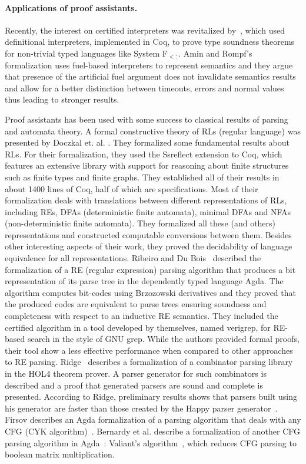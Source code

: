 \paragraph{Applications of proof assistants.}


Recently, the interest on certified interpreters was revitalized by~\citet{Amin17}, which used definitional
interpreters, implemented in Coq, to prove type soundness theorems for non-trivial typed languages like System F$_{<:}$.
Amin and Rompf's formalization uses fuel-based interpreters to represent semantics and they argue that presence of
the artificial fuel argument does not invalidate semantics results and allow for a better distinction between timeouts,
errors and normal values thus leading to stronger results.


Proof assistants has been used with some success to classical results of parsing and automata theory.
A formal constructive theory of RLs (regular language) was presented by Doczkal et. al.
\cite{Doczkal13}. They formalized some fundamental results about RLs.
For their formalization, they used the Ssreflect extension to Coq, which
features an extensive library with support for reasoning about finite
structures such as finite types and finite graphs. They established all
of their results in about 1400 lines of Coq, half of which are specifications.
Most of their formalization deals with translations between different
representations of RLs, including REs, DFAs (deterministic finite automata),
minimal DFAs and NFAs (non-deterministic finite automata).
They formalized all these (and others) representations and constructed
computable conversions between them. Besides other interesting aspects
of their work, they proved the decidability of language equivalence
for all representations. Ribeiro and Du Bois~\cite{Ribeiro17} described the formalization of a RE
(regular expression) parsing algorithm that produces a bit representation
of its parse tree in the dependently typed language Agda. The algorithm computes bit-codes using Brzozowski derivatives and
they proved that the produced codes are equivalent to parse trees ensuring soundness and completeness with respect to an
inductive RE semantics. They included the certified algorithm in a tool developed by themselves, named verigrep, for RE-based
search in the style of GNU grep. While the authors provided formal proofs, their tool show a less effective performance when compared to
other approaches to RE parsing. Ridge~\cite{Ridge2011} describes a formalization of a combinator parsing library  in the HOL4 theorem
prover. A parser generator for such
combinators is described and a proof that generated parsers are sound
and complete is presented.  According to Ridge, preliminary results
shows that parsers built using his generator are faster than those
created by the Happy parser generator~\cite{Happy}.
Firsov describes an Agda formalization of a parsing algorithm that
deals with any CFG (CYK algorithm)~\cite{Firsov2014}. Bernardy
et al. describe a formalization of another CFG parsing algorithm in
Agda~\cite{BernardyJ16}: Valiant's algorithm~\cite{Valiant1975}, which
reduces CFG parsing to boolean matrix multiplication. 


